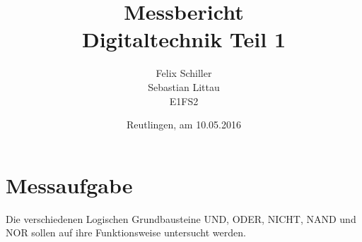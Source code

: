 \documentclass[
a4paper,     %
 headsepline, %
11pt         %
]{scrartcl}  %
\title{Messbericht \\ Digitaltechnik Teil 1}
\author{Felix Schiller \\ Sebastian Littau \\ E1FS2}
\date{Reutlingen, am 10.05.2016}
\begin{document}

\maketitle

\newpage
\tableofcontents





\section*{Messaufgabe}
Die verschiedenen Logischen Grundbausteine UND, ODER, NICHT, NAND und NOR sollen auf ihre Funktionsweise untersucht werden.
\end{document}
